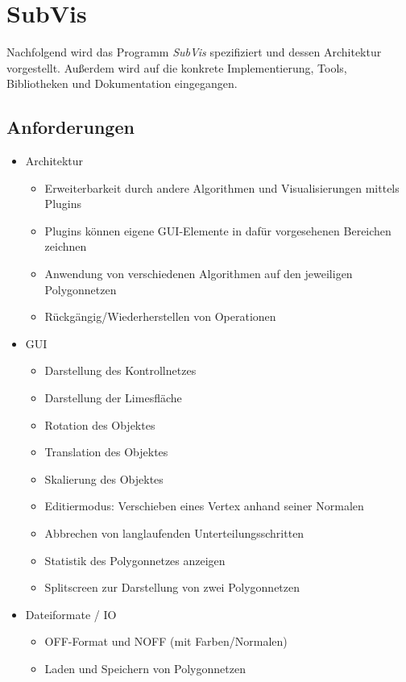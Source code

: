 \chapter{SubVis}

Nachfolgend wird das Programm \emph{SubVis} spezifiziert und dessen Architektur vorgestellt.
Außerdem wird auf die konkrete Implementierung, Tools, Bibliotheken und Dokumentation eingegangen.

\section{Anforderungen}

\begin{itemize}
 \item Architektur
 \begin{itemize}
 	\item Erweiterbarkeit durch andere Algorithmen und Visualisierungen mittels Plugins
 	\item Plugins können eigene GUI-Elemente in dafür vorgesehenen Bereichen zeichnen
 	  \item Anwendung von verschiedenen Algorithmen auf den jeweiligen Polygonnetzen
 	  \item Rückgängig/Wiederherstellen von Operationen
 \end{itemize}
 \item GUI
  \begin{itemize}
 	\item Darstellung des Kontrollnetzes
 	\item Darstellung der Limesfläche
 	\item Rotation des Objektes
 	\item Translation des Objektes
 	\item Skalierung des Objektes
 	\item Editiermodus: Verschieben eines Vertex anhand seiner Normalen
 	\item Abbrechen von langlaufenden Unterteilungsschritten
    \item Statistik des Polygonnetzes anzeigen
    \item Splitscreen zur Darstellung von zwei Polygonnetzen
 \end{itemize}
 \item Dateiformate / IO
 \begin{itemize}
 	\item OFF-Format und NOFF (mit Farben/Normalen)
 	\item Laden und Speichern von Polygonnetzen
 \end{itemize}

\end{itemize}
